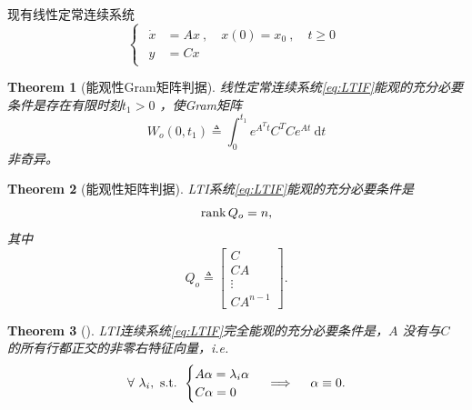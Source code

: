 \documentclass[14pt,a4paper]{article}
\theoremstyle{plain}
\newtheorem{thm}{Theorem}[section]
\theoremstyle{definition}
\theoremstyle{remark}
\theoremstyle{plain}
\theoremstyle{plain}
\theoremstyle{plain}
\theoremstyle{definition}
\theoremstyle{remark}
\numberwithin{equation}{section}
\begin{document}
				现有线性定常连续系统
				\begin{equation}
				\label{eq:LTIF}
					\begin{cases}
						\begin{aligned}
							\dot x &= Ax \ ,\quad x(0)=x_0\ ,\quad t\ge 0 \\ 
							y &= Cx
						\end{aligned}  
					\end{cases} 
				\end{equation} 

				\begin{thm}[能观性Gram矩阵判据]  
				\label{the:能观性gram矩阵判据}
					线性定常连续系统\eqref{eq:LTIF}能观的充分必要条件是存在有限时刻$t_1>0$ ，使Gram矩阵
					\begin{equation}
					\label{eq:gram_ob}
					W_o(0,t_1) \triangleq \int_0^{t_1} e^{A^Tt}C^T C e^{At}\ \mathrm dt
					\end{equation} 
					非奇异。
				\end{thm} 

				\begin{thm}[能观性矩阵判据]  
				\label{the:能观性矩阵判据}
					LTI系统\eqref{eq:LTIF}能观的\emph{充分必要条件}是
					\[
					\mathop{\textnormal{rank}} Q_o = n 
					,\] 
					其中
					\[
						Q_o \triangleq \begin{bmatrix}
							C \\ 
							CA \\
							\vdots\\
							CA^{n-1}
						\end{bmatrix} 
					.\] 
				\end{thm} 

				\begin{thm}[]  
				\label{the:}
				LTI连续系统\eqref{eq:LTIF}完全能观的\emph{充分必要}条件是，$A$ 没有与$C$ 的所有行都正交的非零右特征向量，i.e.  
				\[
					\forall \ \lambda_{i},\ \textnormal{s.t. } 
					\begin{cases}
						A\alpha = \lambda_{i}\alpha \\
						C \alpha = 0
					\end{cases}
					\implies \quad \alpha \equiv 0
				.\] 
				\end{thm} 
\end{document}
